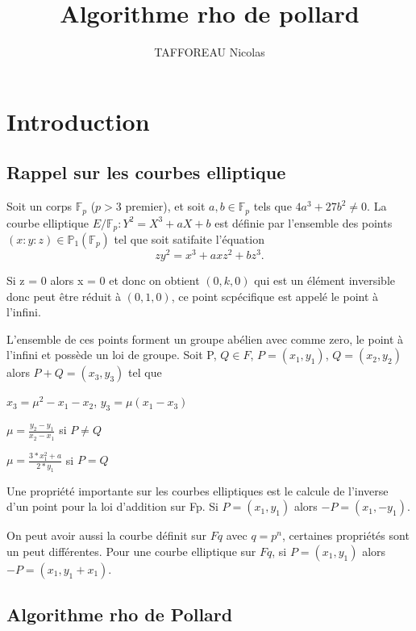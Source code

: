 \documentclass[a4paper,10pt]{report}
\title{Algorithme rho de pollard}
\author{TAFFOREAU Nicolas}
\newcommand{\Fp}{\mathbb{F}_p}
\newcommand{\Pp}{\mathbb{P}_1(\Fp)}
\begin{document}
\maketitle
\tableofcontents
\chapter{Introduction}

\section{Rappel sur les courbes elliptique}

    Soit un corps $\Fp$ ($p > 3$ premier), et soit $a, b \in \Fp$
tels que $4 a^3 + 27 b^2 \ne 0$.
La courbe elliptique $E/\Fp: Y^2 = X^3 + aX + b$ est définie par l'ensemble
des points $(x:y:z)\in \Pp$ tel que soit satifaite l'équation 
$$ z y^2 = x^3 + a x z^2 + b z^3.$$

  Si z = 0 alors x = 0 et donc on obtient $(0,k,0)$ qui est un élément inversible donc peut être réduit à $(0,1,0)$, ce point scpécifique est appelé le point à l'infini.

  L'ensemble de ces points forment un groupe abélien avec comme zero, le point à l'infini et possède un loi de groupe.
  Soit P, $Q \in F$, $ P = (x_1,y_1)$, $Q = (x_2,y_2)$ alors $P+Q = (x_3,y_3)$ tel que 
    \begin{center}
      $x_3 = \mu^2 -x_1 - x_2$, $y_3 = \mu(x_1-x_3)$
    \end{center}
    \begin{center}
      $\mu = \frac{y_2 - y_1}{x_2 - x_1}$ si $P \ne Q$
    \end{center}
    \begin{center}
      $\mu = \frac{3*x_1^2 + a}{2*y_1}$ si $P = Q$
    \end{center}


Une propriété importante sur les courbes elliptiques est le calcule de l'inverse d'un point pour la loi d'addition sur Fp. Si $P = (x_1,y_1)$ alors $-P = (x_1,-y_1)$.

On peut avoir aussi la courbe définit sur $Fq$ avec $q = p^n$, certaines propriétés sont un peut différentes.
Pour une courbe elliptique sur $Fq$, si $P = (x_1,y_1)$ alors $-P = (x_1,y_1+x_1)$.

\section{Algorithme rho de Pollard}
\end{document}
